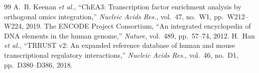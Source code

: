 \documentclass[journal]{IEEEtran}
\begin{document}
\begin{thebibliography}{99}
 A.~B. Keenan \emph{et al.}, ``ChEA3: Transcription factor enrichment analysis by orthogonal omics integration,'' \emph{Nucleic Acids Res.}, vol.~47, no.~W1, pp.~W212--W224, 2019.
 The ENCODE Project Consortium, ``An integrated encyclopedia of DNA elements in the human genome,'' \emph{Nature}, vol.~489, pp.~57--74, 2012.
 H.~Han \emph{et al.}, ``TRRUST v2: An expanded reference database of human and mouse transcriptional regulatory interactions,'' \emph{Nucleic Acids Res.}, vol.~46, no.~D1, pp.~D380--D386, 2018.
\end{thebibliography}
\end{document}
